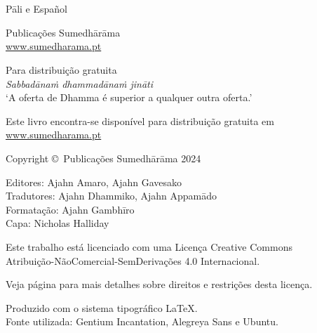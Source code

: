 
\thispagestyle{empty}

\enlargethispage{\baselineskip}

{\centering\small
\setlength{\parskip}{15pt}

{\normalsize
\thetitle\\
\thesubtitle\\
Pāli e Español}

Publicações Sumedhārāma\\
\href{http://sumedharama.pt}{www.sumedharama.pt}

Para distribuição gratuita\\
\textit{Sabbadānaṁ dhammadānaṁ jināti}\\
‘A oferta de Dhamma é superior a qualquer outra oferta.’

Este livro encontra-se disponível para distribuição gratuita em\\
\href{http://sumedharama.pt}{www.sumedharama.pt}


Copyright \copyright\ Publicações Sumedhārāma 2024

Editores: Ajahn Amaro, Ajahn Gavesako\\
Tradutores: Ajahn Dhammiko, Ajahn Appamādo\\
Formatação: Ajahn Gambhīro\\
Capa: Nicholas Halliday

\vfill

Este trabalho está licenciado com uma Licença Creative Commons\\
Atribuição-NãoComercial-SemDerivações 4.0 Internacional.

Veja página \pageref{copyright-details} para mais detalhes sobre direitos e restrições desta licença.

Produzido com o sistema tipográfico \LaTeX.\\
Fonte utilizada: Gentium Incantation, Alegreya Sans e Ubuntu.

\theEditionInfo

}
